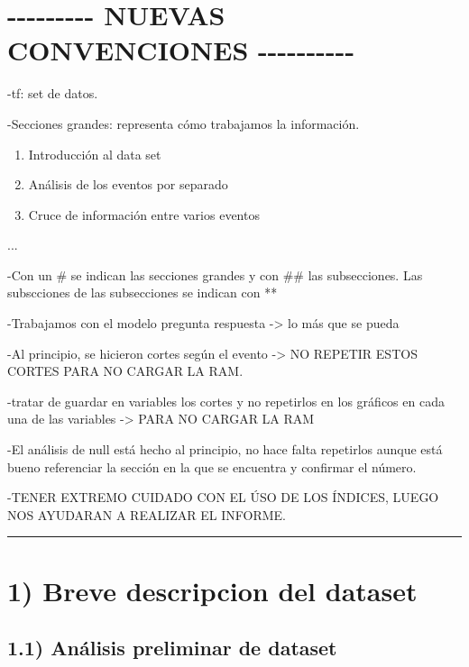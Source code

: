 \documentclass[11pt]{article}
\begin{document}
    \section{-\/-\/-\/-\/-\/-\/-\/-\/- NUEVAS CONVENCIONES
-\/-\/-\/-\/-\/-\/-\/-\/-\/-}\label{nuevas-convenciones-----------}

-tf: set de datos.

-Secciones grandes: representa cómo trabajamos la información.

\begin{enumerate}
\def\labelenumi{\arabic{enumi})}
\item
  Introducción al data set
\item
  Análisis de los eventos por separado
\item
  Cruce de información entre varios eventos
\end{enumerate}

...

-Con un \# se indican las secciones grandes y con \#\# las subsecciones.
Las subscciones de las subsecciones se indican con **

-Trabajamos con el modelo pregunta respuesta -\textgreater{} lo más que
se pueda

-Al principio, se hicieron cortes según el evento -\textgreater{} NO
REPETIR ESTOS CORTES PARA NO CARGAR LA RAM.

-tratar de guardar en variables los cortes y no repetirlos en los
gráficos en cada una de las variables -\textgreater{} PARA NO CARGAR LA
RAM

-El análisis de null está hecho al principio, no hace falta repetirlos
aunque está bueno referenciar la sección en la que se encuentra y
confirmar el número.

-TENER EXTREMO CUIDADO CON EL ÚSO DE LOS ÍNDICES, LUEGO NOS AYUDARAN A
REALIZAR EL INFORME.

\begin{center}\rule{0.5\linewidth}{\linethickness}\end{center}

    \section{1) Breve descripcion del
dataset}\label{breve-descripcion-del-dataset}

    \subsection{1.1) Análisis preliminar de
dataset}\label{anuxe1lisis-preliminar-de-dataset}
\end{document}

